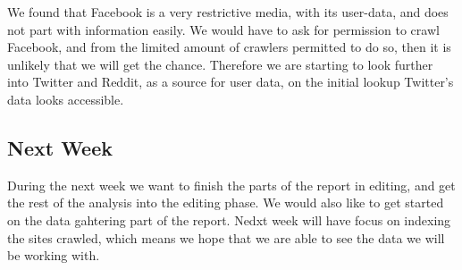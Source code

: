 We found that Facebook is a very restrictive media, with its user-data, and does
not part with information easily. We would have to ask for permission to crawl
Facebook, and from the limited amount of crawlers permitted to do so, then it is
unlikely that we will get the chance. Therefore we are starting to look further into
Twitter and Reddit, as a source for user data, on the initial lookup Twitter's
data looks accessible.

\subsection*{Next Week}
During the next week we want to finish the parts of the report in editing, and
get the rest of the analysis into the editing phase. We would also like to get
started on the data gahtering part of the report. Nedxt week will have focus on
indexing the sites crawled, which means we hope that we are able to see the data
we will be working with.







